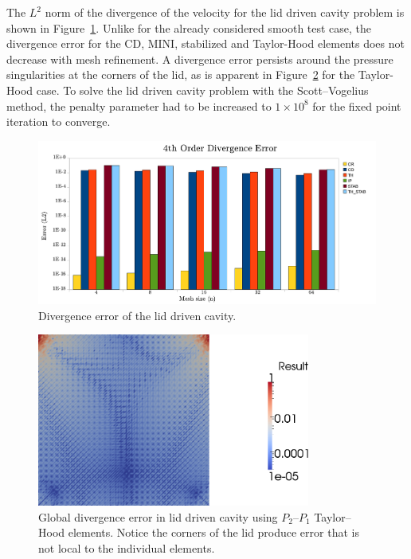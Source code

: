 The $L^{2}$ norm of the divergence of the velocity for the lid driven
cavity problem is shown in Figure~\ref{fig:terrel:4th_Order_lid}.
Unlike for the already considered smooth test case, the divergence
error for the CD, MINI, stabilized and Taylor-Hood elements does not
decrease with mesh refinement.  A divergence error persists around
the pressure singularities at the corners of the lid, as is apparent
in Figure~\ref{fig:terrel:lid_div_error} for the Taylor-Hood case.
To solve the lid driven cavity problem with the Scott--Vogelius method,
the penalty parameter had to be increased to $1 \times 10^{8}$ for the
fixed point iteration to converge.

\begin{figure}
  \center \includegraphics[width=\largefig]{chapters/terrel/pdf/div_4_test.pdf}
  \caption{Divergence error of the lid driven cavity.}
\label{fig:terrel:4th_Order_lid}
\end{figure}

\begin{figure}
  \center\includegraphics[width=0.8\textwidth]{chapters/terrel/png/lid_div_error.png}
  \caption{Global divergence error in lid driven cavity using $P_2$--$P_1$
  Taylor--Hood elements. Notice the corners of the lid produce error that is
  not local to the individual elements.}
  \label{fig:terrel:lid_div_error}
\end{figure}

